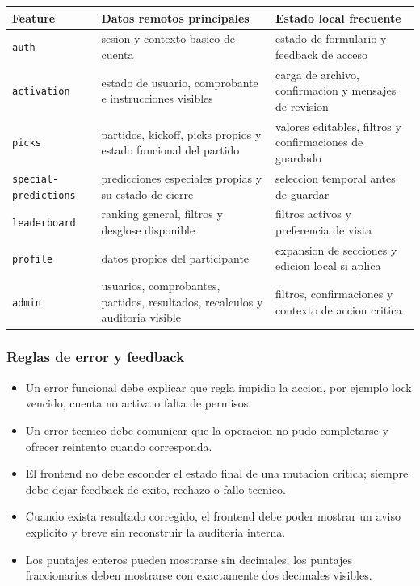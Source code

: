 \begin{longtable}{p{}p{}p{}}
\toprule
\textbf{Feature} & \textbf{Datos remotos principales} & \textbf{Estado local frecuente} \\
\midrule
\texttt{auth} & sesion y contexto basico de cuenta & estado de formulario y feedback de acceso \\
\texttt{activation} & estado de usuario, comprobante e instrucciones visibles & carga de archivo, confirmacion y mensajes de revision \\
\texttt{picks} & partidos, kickoff, picks propios y estado funcional del partido & valores editables, filtros y confirmaciones de guardado \\
\texttt{special-predictions} & predicciones especiales propias y su estado de cierre & seleccion temporal antes de guardar \\
\texttt{leaderboard} & ranking general, filtros y desglose disponible & filtros activos y preferencia de vista \\
\texttt{profile} & datos propios del participante & expansion de secciones y edicion local si aplica \\
\texttt{admin} & usuarios, comprobantes, partidos, resultados, recalculos y auditoria visible & filtros, confirmaciones y contexto de accion critica \\
\bottomrule
\end{longtable}

\subsubsection{Reglas de error y feedback}

\begin{itemize}
  \item Un error funcional debe explicar que regla impidio la accion, por ejemplo lock vencido, cuenta no activa o falta de permisos.
  \item Un error tecnico debe comunicar que la operacion no pudo completarse y ofrecer reintento cuando corresponda.
  \item El frontend no debe esconder el estado final de una mutacion critica; siempre debe dejar feedback de exito, rechazo o fallo tecnico.
  \item Cuando exista resultado corregido, el frontend debe poder mostrar un aviso explicito y breve sin reconstruir la auditoria interna.
  \item Los puntajes enteros pueden mostrarse sin decimales; los puntajes fraccionarios deben mostrarse con exactamente dos decimales visibles.
\end{itemize}

